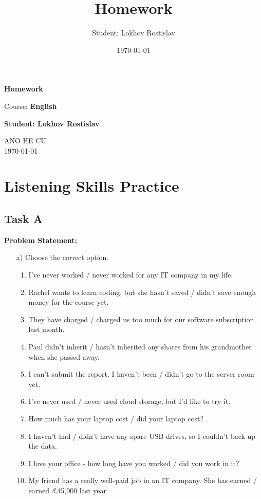 \documentclass[a4paper,12pt]{article}
\title{Homework}
\author{Student: Lokhov Rostislav}
\date{\today}
\begin{document}
\begin{titlepage}
    \centering
    \vspace*{1cm}

    \Huge
    \textbf{Homework}

    \vspace{0.5cm}
    \LARGE
    Course: \textbf{English}

    \vspace{1.5cm}

    \textbf{Student: Lokhov Rostislav}

    \vfill

    \Large
    ANO HE CU\\
    \vspace{0.3cm}
    \today

\end{titlepage}

\tableofcontents
\newpage

\section{Listening Skills Practice}

\subsection{Task A}
\textbf{Problem Statement:}
\begin{itemize}
    \item[a)] Choose the correct option. 
    \begin{enumerate}
        \item I've never worked / never worked for any IT company in my life.
        \item Rachel wants to learn coding, but she hasn't saved / didn’t save enough money for the course yet.
        \item They have charged / charged us too much for our software subscription last month.
        \item Paul didn't inherit / hasn’t inherited any shares from his grandmother when she passed away.
        \item I can't submit the report. I haven't been / didn’t go to the server room yet.
        \item I've never used / never used cloud storage, but I'd like to try it.
        \item How much has your laptop cost / did your laptop cost?
        \item I haven't had / didn't have any spare USB drives, so I couldn't back up the data.
        \item I love your office - how long have you worked / did you work in it?
        \item My friend has a really well-paid job in an IT company. She has earned / earned £45,000 last year
    \end{enumerate}
\end{itemize}
\end{document}
